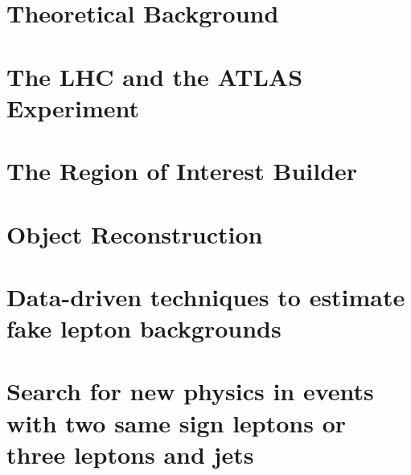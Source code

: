 \documentclass{outhesis}
\begin{document}
\chapter{Theoretical Background}\label{sec:theory}


\chapter{The LHC and the ATLAS Experiment}\label{sec:lhcatlas}


\chapter{The Region of Interest Builder}\label{sec:roib}


\chapter{Object Reconstruction}\label{sec:reco}


\chapter{Data-driven techniques to estimate fake lepton backgrounds}\label{sec:fake}


\chapter{Search for new physics in events with two same sign leptons or three leptons and jets}\label{sec:ss3l}

\end{document}
